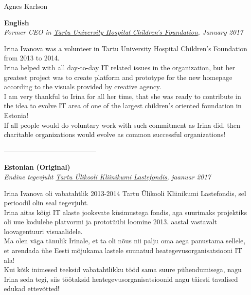 \documentclass[a4paper, 12pt]{article}
\begin{document}
{

\begin{center}
\LARGE{Agnes Karlson}
\end{center}

\begin{center}
\textbf{English}\\
\textit{Former CEO in \href{https://www.lastefond.ee}{Tartu University Hospital Children's Foundation}, January 2017}
\end{center}

Irina Ivanova was a volunteer in Tartu University Hospital Children's Foundation from 2013 to 2014.\\

Irina helped with all day-to-day IT related issues in the organization, but her greatest project was to create platform and prototype for the new homepage according to the visuals provided by creative agency.\\ 

I am very thankful to Irina for all her time, that she was ready to contribute in the idea to evolve IT area of one of the largest children's oriented foundation in Estonia!\\

If all people would do voluntary work with such commitment as Irina did, then charitable organizations would evolve as common successful organizations!\\

\begin{center}
\------------------------------------------
\end{center}

\begin{center}
\textbf{Estonian (Original)}\\
\textit{Endine tegevjuht \href{https://www.lastefond.ee}{Tartu Ülikooli Kliinikumi Lastefondis}, jaanuar 2017}
\end{center}

Irina Ivanova oli vabatahtlik 2013-2014 Tartu Ülikooli Kliinikumi Lastefondis, sel perioodil olin seal tegevjuht.\\

Irina aitas kõigi IT alaste jooksvate küsimustega fondis, aga suurimaks projektiks oli uue kodulehe platvormi ja prototüübi loomine 2013. aastal vastavalt loovagentuuri visuaalidele.\\

Ma olen väga tänulik Irinale, et ta oli nõus nii palju oma aega panustama sellele, et arendada ühe Eesti mõjukama lastele suunatud heategevusorganisatsiooni IT ala!\\

Kui kõik inimesed teeksid vabatahtlikku tööd sama suure pühendumisega, nagu Irina seda tegi, siis töötaksid heategevusorganisatsioonid nagu täiesti tavalised edukad ettevõtted!\\

}
\end{document}
